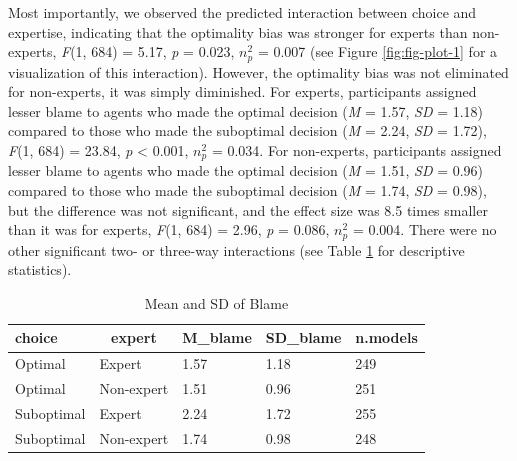 \documentclass[
  man,floatsintext]{apa6}
\begin{document}
Most importantly, we observed the predicted interaction between choice and expertise, indicating that the optimality bias was stronger for experts than non-experts, \emph{F}(1, 684) = 5.17, \emph{p} = 0.023, \(n^2_p\) = 0.007 (see Figure \ref{fig:fig-plot-1} for a visualization of this interaction). However, the optimality bias was not eliminated for non-experts, it was simply diminished. For experts, participants assigned lesser blame to agents who made the optimal decision (\emph{M} = 1.57, \emph{SD} = 1.18) compared to those who made the suboptimal decision (\emph{M} = 2.24, \emph{SD} = 1.72), \emph{F}(1, 684) = 23.84, \emph{p} \textless{} 0.001, \(n^2_p\) = 0.034. For non-experts, participants assigned lesser blame to agents who made the optimal decision (\emph{M} = 1.51, \emph{SD} = 0.96) compared to those who made the suboptimal decision (\emph{M} = 1.74, \emph{SD} = 0.98), but the difference was not significant, and the effect size was 8.5 times smaller than it was for experts, \emph{F}(1, 684) = 2.96, \emph{p} = 0.086, \(n^2_p\) = 0.004. There were no other significant two- or three-way interactions (see Table \ref{tab:table-table1} for descriptive statistics).

\begin{table}[tbp]

\begin{center}
\begin{threeparttable}

\caption{\label{tab:table-table1}Mean and SD of Blame}

\begin{tabular}{lllll}
\toprule
choice & \multicolumn{1}{c}{expert} & \multicolumn{1}{c}{M\_blame} & \multicolumn{1}{c}{SD\_blame} & \multicolumn{1}{c}{n.models}\\
\midrule
Optimal & Expert & 1.57 & 1.18 & 249\\
Optimal & Non-expert & 1.51 & 0.96 & 251\\
Suboptimal & Expert & 2.24 & 1.72 & 255\\
Suboptimal & Non-expert & 1.74 & 0.98 & 248\\
\bottomrule
\end{tabular}

\end{threeparttable}
\end{center}

\end{table}
\end{document}
